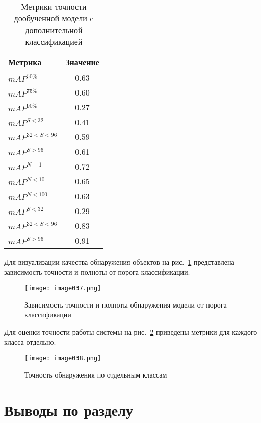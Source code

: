 \begin{table}[H]
	\def\arraystretch{1.3}
	\caption{Метрики точности дообученной модели c дополнительной классификацией}
	\begin{center}
		\begin{tabular}{|l|c|}
			\hline
			Метрика & Значение\\  \hline			
			\(mAP^{50\%}\) & 0.63\\ \hline			
			\(mAP^{75\%}\) & 0.60\\ \hline
			\(mAP^{90\%}\) & 0.27\\ \hline
			\(mAP^{S<32}\) & 0.41\\ \hline
			\(mAP^{32<S<96}\) & 0.59\\ \hline
			\(mAP^{S>96}\) & 0.61\\ \hline
			\(mAP^{N=1}\) & 0.72\\ \hline
			\(mAP^{N<10}\) & 0.65\\ \hline
			\(mAP^{N<100}\) & 0.63\\ \hline
			\(mAP^{S<32}\) & 0.29\\ \hline
			\(mAP^{32<S<96}\) & 0.83\\ \hline
			\(mAP^{S>96}\) & 0.91\\ \hline			
		\end{tabular}
		\label{tabular:tab_exp_4}
	\end{center}
\end{table}

Для визуализации качества обнаружения объектов на рис.~\ref{fig:image037} представлена зависимость точности и полноты от порога классификации.

\begin{figure}[htbp]
\centering
\texttt{[image: image037.png]}
\caption{Зависимость точности и полноты обнаружения модели от порога классификации}%
\label{fig:image037}
\end{figure}

Для оценки точности работы системы на рис.~\ref{fig:image038} приведены метрики для каждого класса отдельно.

\begin{figure}[htbp]
\centering
\texttt{[image: image038.png]}
\caption{Точность обнаружения по отдельным классам}%
\label{fig:image038}
\end{figure}

\section{Выводы по разделу}

